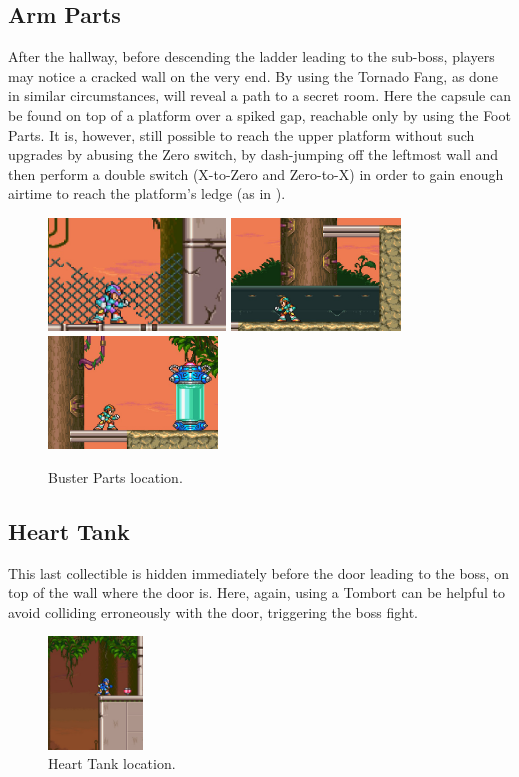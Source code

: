 \subsection{Arm Parts} 
After the hallway, before descending the ladder leading to the sub-boss, players may notice a cracked wall on the very end. By using the Tornado Fang, as done in similar circumstances, will reveal a path to a secret room. Here the capsule can be found on top of a platform over a spiked gap, reachable only by using the Foot Parts. It is, however, still possible to reach the upper platform without such upgrades by abusing the Zero switch, by dash-jumping off the leftmost wall and then perform a double switch (X-to-Zero and Zero-to-X) in order to gain enough airtime to reach the platform's ledge (as in ).
\begin{figure}[htp]
	\centering
	\includegraphics[height=3cm]{figures/X3/Neon_tiger/Armor_1.png}
	\includegraphics[height=3cm]{figures/X3/Neon_tiger/Armor_2.png}\vspace{2pt}\\
	\includegraphics[height=3cm]{figures/X3/Neon_tiger/Armor_3.png}
	\caption{Buster Parts location.}
\end{figure}


\subsection{Heart Tank}
This last collectible is hidden immediately before the door leading to the boss, on top of the wall where the door is. Here, again, using a Tombort can be helpful to avoid colliding erroneously with the door, triggering the boss fight.
\begin{figure}[htp]
	\centering
	\includegraphics[height=3cm]{figures/X3/Neon_tiger/heart.jpg}
	\caption{Heart Tank location.}
\end{figure}


